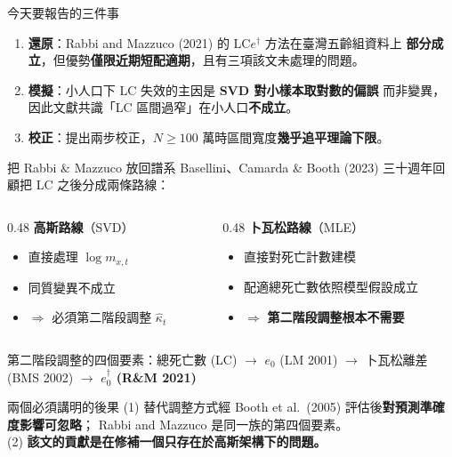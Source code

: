 \documentclass[aspectratio=169, UTF8, fontset=macnew, 11pt]{ctexbeamer}
\newcommand{\edag}{e_0^{\dagger}}
\newcommand{\LCe}{\text{LC}e^{\dagger}}
\newcommand{\hi}[1]{\textcolor{red!70!black}{\textbf{#1}}}
\newcommand{\gd}[1]{\textcolor{green!45!black}{\textbf{#1}}}
\begin{document}
\begin{frame}{今天要報告的三件事}
\begin{enumerate}\setlength{\itemsep}{10pt}
  \item \textbf{還原}：Rabbi and Mazzuco (2021) 的 $\LCe$ 方法在臺灣五齡組資料上
        \gd{部分成立}，但優勢\hi{僅限近期短配適期}，且有三項該文未處理的問題。
  \item \textbf{模擬}：小人口下 LC 失效的主因是 \hi{SVD 對小樣本取對數的偏誤}
        而非變異，因此文獻共識「LC 區間過窄」在小人口\hi{不成立}。
  \item \textbf{校正}：提出兩步校正，$N\ge100$ 萬時區間寬度\gd{幾乎追平理論下限}。
\end{enumerate}
\end{frame}

\begin{frame}{把 Rabbi \& Mazzuco 放回譜系}
Basellini、Camarda \& Booth (2023) 三十週年回顧把 LC 之後分成兩條路線：
\vspace{6pt}
\begin{columns}[T]
\begin{column}{0.48\textwidth}
\textbf{高斯路線}（SVD）
\begin{itemize}\small
  \item 直接處理 $\log m_{x,t}$
  \item 同質變異不成立
  \item $\Rightarrow$ 必須第二階段調整 $\hat\kappa_t$
\end{itemize}
\end{column}
\begin{column}{0.48\textwidth}
\textbf{卜瓦松路線}（MLE）
\begin{itemize}\small
  \item 直接對死亡計數建模
  \item 配適總死亡數依照模型假設成立
  \item $\Rightarrow$ \hi{第二階段調整根本不需要}
\end{itemize}
\end{column}
\end{columns}
\vspace{10pt}
第二階段調整的四個要素：總死亡數 (LC) $\to$ $e_0$ (LM 2001) $\to$
卜瓦松離差 (BMS 2002) $\to$ \hi{$\edag$ (R\&M 2021)}
\vspace{6pt}
\begin{block}{兩個必須講明的後果}
\small
(1) 替代調整方式經 Booth et al.\ (2005) 評估後\textbf{對預測準確度影響可忽略}；
Rabbi and Mazzuco 是同一族的第四個要素。\\
(2) \textbf{該文的貢獻是在修補一個只存在於高斯架構下的問題。}
\end{block}
\end{frame}
\end{document}
